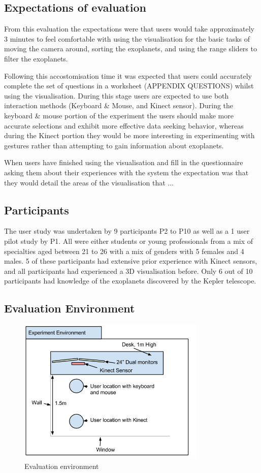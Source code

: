 \subsection{Expectations of evaluation}
From this evaluation the expectations were that users would take approximately 3
minutes to feel comfortable with using the visualisation for the basic tasks of
moving the camera around, sorting the exoplanets, and using the range sliders to
filter the exoplanets. 

Following this accostomisation time it was expected that users could accurately
complete the set of questions in a worksheet (APPENDIX QUESTIONS) whilst using
the visualisation. During this stage users are expected to use both interaction
methods (Keyboard \& Mouse, and Kinect sensor). During the keyboard \& mouse
portion of the experiment the users should make more accurate selections and
exhibit more effective data seeking behavior, whereas during the Kinect portion
they would be more interesting in experimenting with gestures rather than
attempting to gain information about exoplanets. 

When users have finished using the visualisation and fill in the questionnaire
asking them about their experiences with the system the expectation was that
they would detail the areas of the visualisation that ...~

\subsection{Participants}
The user study was undertaken by 9 participants P2 to P10 as well as a 1 user
pilot study by P1. All were either students or
young professionals from a mix of specialties aged between 21 to 26 with a mix
of genders with 5 females and 4 males. 5 of these participants had extensive
prior experience with Kinect sensors, and all participants had experienced a 3D
visualisation before. Only 6 out of 10 participants had knowledge of the
exoplanets discovered by the Kepler telescope.

\subsection{Evaluation Environment}
\begin{figure}[H]
  \centering
      \includegraphics[width=0.8\textwidth]{images/environment.png}
  \caption{Evaluation environment}  
    \label{fig:environment}
\end{figure}


